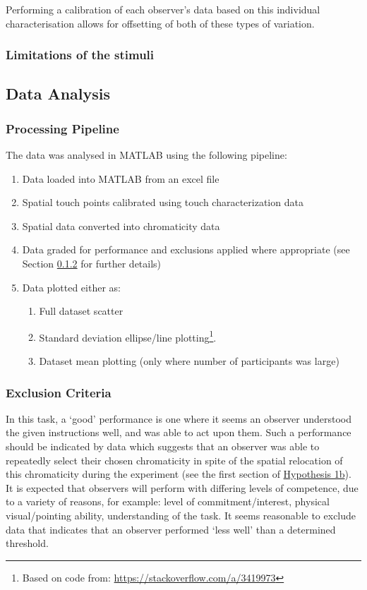 Performing a calibration of each observer's data based on this individual characterisation allows for offsetting of both of these types of variation. 

\subsubsection{Limitations of the stimuli}

\subsection{Data Analysis}
\subsubsection{Processing Pipeline}

The data was analysed in MATLAB using the following pipeline:
\begin{enumerate}
\item Data loaded into MATLAB from an excel file
\item Spatial touch points calibrated using touch characterization data
\item Spatial data converted into chromaticity data
\item Data graded for performance and exclusions applied where appropriate (see Section \ref{sec:exclusion} for further details) 
\item Data plotted either as:
\begin{enumerate}
\item Full dataset scatter
\item Standard deviation ellipse/line plotting\footnote{Based on code from: \url{https://stackoverflow.com/a/3419973}}.
\item Dataset mean plotting (only where number of participants was large)
\end{enumerate}
\end{enumerate}

\subsubsection{Exclusion Criteria} \label{sec:exclusion}

In this task, a `good' performance is one where it seems an observer understood the given instructions well, and was able to act upon them. Such a performance should be indicated by data which suggests that an observer was able to repeatedly select their chosen chromaticity in spite of the spatial relocation of this chromaticity during the experiment (see the first section of \hyperref[list:hyp1b]{Hypothesis 1b}). It is expected that observers will perform with differing levels of competence, due to a variety of reasons, for example: level of commitment/interest, physical visual/pointing ability, understanding of the task. It seems reasonable to exclude data that indicates that an observer performed `less well' than a determined threshold.

